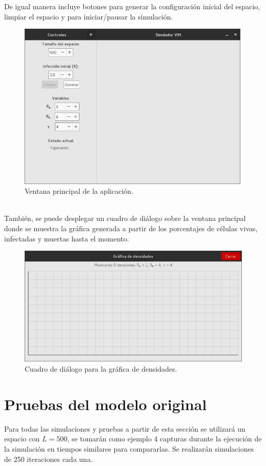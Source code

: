 \documentclass[12pt,letterpaper,oneside]{report}
\begin{document}
	De igual manera incluye botones para generar la configuración inicial del espacio, limpiar el espacio y para iniciar/pausar la simulación.

	\begin{figure}[h!]
		\centering\includegraphics[height=8cm]{img/main.png}
		\caption{Ventana principal de la aplicación.}
	\end{figure}~\\

	También, se puede desplegar un cuadro de diálogo sobre la ventana principal donde se muestra la gráfica generada a partir de los porcentajes de células vivas, infectadas y muertas hasta el momento.
	\begin{figure}[h!]
		\centering\includegraphics[width=12cm]{img/grafica.png}
		\caption{Cuadro de diálogo para la gráfica de densidades.}
	\end{figure}

	\chapter{Pruebas del modelo original}
	Para todas las simulaciones y pruebas a partir de esta sección se utilizará un espacio con $L = 500$, se tomarán como ejemplo 4 capturas durante la ejecución de la simulación en tiempos similares para compararlas. Se realizarán simulaciones de 250 iteraciones cada una.\\
\end{document}
